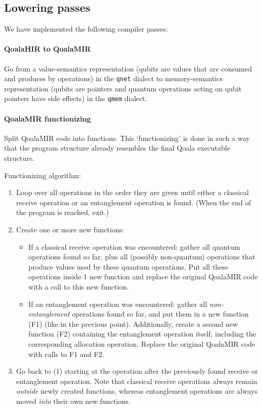 \subsection{Lowering passes}
We have implemented the following compiler passes:

\paragraph{QoalaHIR to QoalaMIR}
Go from a value-semantics representation (qubits are values that are consumed and produces by operations) in the \texttt{qnet} dialect to memory-semantics representation (qubits are pointers and quantum operations acting on qubit pointers have side effects) in the \texttt{qmem} dialect.

\paragraph{QoalaMIR functionizing}
Split QoalaMIR code into functions.
This `functionizing' is done in such a way that the program structure already resembles the final Qoala executable structure.

Functionizing algorithm:
\begin{enumerate}
\item Loop over all operations in the order they are given until either a classical receive operation or an entanglement operation is found. (When the end of the program is reached, exit.)
\item Create one or more new functions:
    \begin{itemize}
        \item If a classical receive operation was encountered: gather all quantum operations found so far, plus all (possibly non-quantum) operations that produce values used by these quantum operations.
        Put all these operations inside 1 new function and replace the original QoalaMIR code with a call to this new function.
        \item If an entanglement operation was encountered: gather all \emph{non-entanglement} operations found so far, and put them in a new function (F1) (like in the previous point).
        Additionally, create a second new function (F2) containing the entanglement operation itself, including the corresponding allocation operation. Replace the original QoalaMIR code with calls to F1 and F2.
    \end{itemize}
\item Go back to (1) starting at the operation after the previously found receive or entanglement operation. Note that classical receive operations always remain \emph{outside} newly created functions, whereas entanglement operations are always moved \emph{into} their own new functions.
\end{enumerate}

